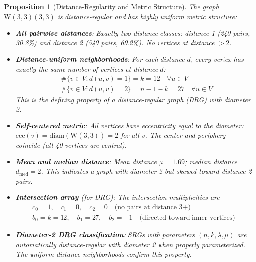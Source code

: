 \documentclass[12pt,a4paper]{article}
\newtheorem{proposition}[theorem]{Proposition}
\newcommand{\W}{\mathrm{W}(3,3)}
\begin{document}
\begin{proposition}[Distance-Regularity and Metric Structure]\label{prop:distanceregular}
The graph $\W(3,3)$ is \emph{distance-regular} and has highly uniform metric structure:
\begin{itemize}
  \item \textbf{All pairwise distances}: Exactly two distance classes: distance 1 (240 pairs, 30.8\%)
        and distance 2 (540 pairs, 69.2\%). %
        No vertices at distance $> 2$.
  \item \textbf{Distance-uniform neighborhoods}: For each distance $d$, every vertex has
        exactly the same number of vertices at distance $d$:
        \begin{align}
          &\#\{v \in V : d(u,v) = 1\} = k = 12 \quad\forall u \in V \\
          &\#\{v \in V : d(u,v) = 2\} = n - 1 - k = 27 \quad\forall u \in V
        \end{align}
        This is the defining property of a \emph{distance-regular graph} (DRG) with diameter 2.
  \item \textbf{Self-centered metric}: All vertices have eccentricity equal to the diameter:
        $\mathrm{ecc}(v) = \mathrm{diam}(\W) = 2$ for all $v$. The center and periphery coincide
        (all 40 vertices are central).
  \item \textbf{Mean and median distance}: Mean distance $\mu = 1.69$; median distance $d_{\mathrm{med}} = 2$.
        This indicates a graph with diameter 2 but skewed toward distance-2 pairs.
  \item \textbf{Intersection array} (for DRG): The intersection multiplicities are
        \begin{align}
          c_0 = 1, \quad c_1 = 0, \quad c_2 = 0 \quad\text{(no pairs at distance 3+)} \\
          b_0 = k = 12, \quad b_1 = 27, \quad b_2 = -1 \quad\text{(directed toward inner vertices)}
        \end{align}
  \item \textbf{Diameter-2 DRG classification}: SRGs with parameters $(n,k,\lambda,\mu)$ are
        automatically distance-regular with diameter 2 when properly parameterized.
        The uniform distance neighborhoods confirm this property.
\end{itemize}
\end{proposition}
\end{document}

